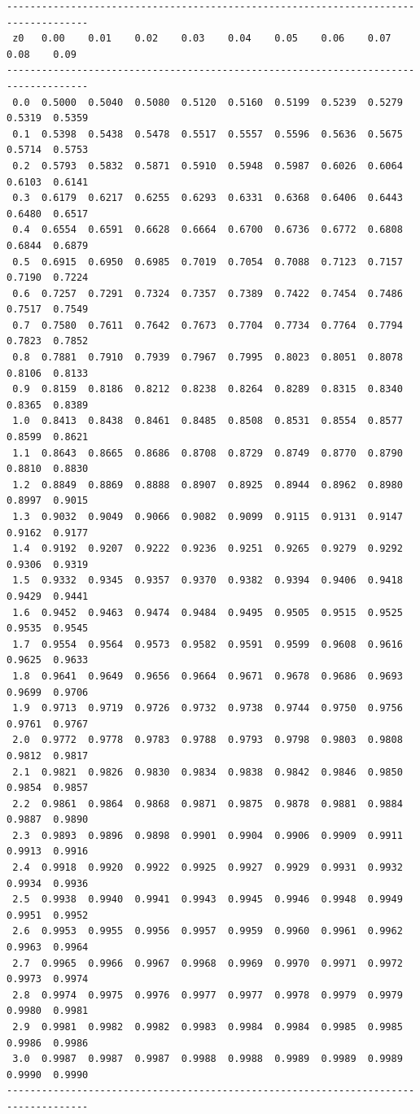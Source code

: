 \begin{verbatim}
------------------------------------------------------------------------------------
 z0   0.00    0.01    0.02    0.03    0.04    0.05    0.06    0.07    0.08    0.09
------------------------------------------------------------------------------------
 0.0  0.5000  0.5040  0.5080  0.5120  0.5160  0.5199  0.5239  0.5279  0.5319  0.5359
 0.1  0.5398  0.5438  0.5478  0.5517  0.5557  0.5596  0.5636  0.5675  0.5714  0.5753
 0.2  0.5793  0.5832  0.5871  0.5910  0.5948  0.5987  0.6026  0.6064  0.6103  0.6141
 0.3  0.6179  0.6217  0.6255  0.6293  0.6331  0.6368  0.6406  0.6443  0.6480  0.6517
 0.4  0.6554  0.6591  0.6628  0.6664  0.6700  0.6736  0.6772  0.6808  0.6844  0.6879
 0.5  0.6915  0.6950  0.6985  0.7019  0.7054  0.7088  0.7123  0.7157  0.7190  0.7224
 0.6  0.7257  0.7291  0.7324  0.7357  0.7389  0.7422  0.7454  0.7486  0.7517  0.7549
 0.7  0.7580  0.7611  0.7642  0.7673  0.7704  0.7734  0.7764  0.7794  0.7823  0.7852
 0.8  0.7881  0.7910  0.7939  0.7967  0.7995  0.8023  0.8051  0.8078  0.8106  0.8133
 0.9  0.8159  0.8186  0.8212  0.8238  0.8264  0.8289  0.8315  0.8340  0.8365  0.8389
 1.0  0.8413  0.8438  0.8461  0.8485  0.8508  0.8531  0.8554  0.8577  0.8599  0.8621
 1.1  0.8643  0.8665  0.8686  0.8708  0.8729  0.8749  0.8770  0.8790  0.8810  0.8830
 1.2  0.8849  0.8869  0.8888  0.8907  0.8925  0.8944  0.8962  0.8980  0.8997  0.9015
 1.3  0.9032  0.9049  0.9066  0.9082  0.9099  0.9115  0.9131  0.9147  0.9162  0.9177
 1.4  0.9192  0.9207  0.9222  0.9236  0.9251  0.9265  0.9279  0.9292  0.9306  0.9319
 1.5  0.9332  0.9345  0.9357  0.9370  0.9382  0.9394  0.9406  0.9418  0.9429  0.9441
 1.6  0.9452  0.9463  0.9474  0.9484  0.9495  0.9505  0.9515  0.9525  0.9535  0.9545
 1.7  0.9554  0.9564  0.9573  0.9582  0.9591  0.9599  0.9608  0.9616  0.9625  0.9633
 1.8  0.9641  0.9649  0.9656  0.9664  0.9671  0.9678  0.9686  0.9693  0.9699  0.9706
 1.9  0.9713  0.9719  0.9726  0.9732  0.9738  0.9744  0.9750  0.9756  0.9761  0.9767
 2.0  0.9772  0.9778  0.9783  0.9788  0.9793  0.9798  0.9803  0.9808  0.9812  0.9817
 2.1  0.9821  0.9826  0.9830  0.9834  0.9838  0.9842  0.9846  0.9850  0.9854  0.9857
 2.2  0.9861  0.9864  0.9868  0.9871  0.9875  0.9878  0.9881  0.9884  0.9887  0.9890
 2.3  0.9893  0.9896  0.9898  0.9901  0.9904  0.9906  0.9909  0.9911  0.9913  0.9916
 2.4  0.9918  0.9920  0.9922  0.9925  0.9927  0.9929  0.9931  0.9932  0.9934  0.9936
 2.5  0.9938  0.9940  0.9941  0.9943  0.9945  0.9946  0.9948  0.9949  0.9951  0.9952
 2.6  0.9953  0.9955  0.9956  0.9957  0.9959  0.9960  0.9961  0.9962  0.9963  0.9964
 2.7  0.9965  0.9966  0.9967  0.9968  0.9969  0.9970  0.9971  0.9972  0.9973  0.9974
 2.8  0.9974  0.9975  0.9976  0.9977  0.9977  0.9978  0.9979  0.9979  0.9980  0.9981
 2.9  0.9981  0.9982  0.9982  0.9983  0.9984  0.9984  0.9985  0.9985  0.9986  0.9986
 3.0  0.9987  0.9987  0.9987  0.9988  0.9988  0.9989  0.9989  0.9989  0.9990  0.9990
------------------------------------------------------------------------------------


\end{verbatim}
